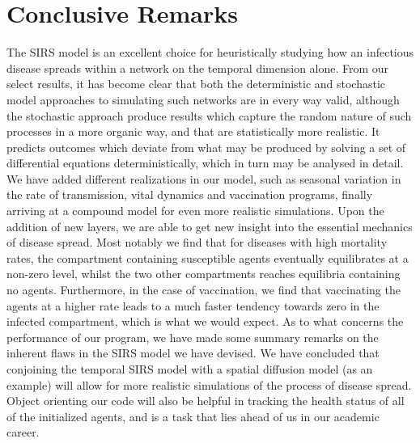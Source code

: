 \section{Conclusive Remarks}
The SIRS model is an excellent choice for heuristically studying how an infectious disease spreads within a network on the temporal dimension alone. From our select results, it has become clear that both the deterministic and stochastic model approaches to simulating such networks are in every way valid, although the stochastic approach produce results which capture the random nature of such processes in a more organic way, and that are statistically more realistic. It predicts outcomes which deviate 
from what may be produced by solving a set of differential equations deterministically, which in turn may be analysed in detail. We have added different realizations in our model, such as seasonal variation in the rate of transmission, vital dynamics and vaccination programs, finally arriving at a compound model for even more realistic simulations. Upon the addition of new layers, we are able to get new insight into the essential mechanics of disease spread. Most notably we find that for diseases with high mortality rates, the compartment containing susceptible agents eventually equilibrates at a non-zero level, whilst the two other compartments reaches equilibria containing no agents. Furthermore, in the case of vaccination, we find that vaccinating the agents at a higher rate leads to a much faster tendency towards zero in the infected compartment, which is what we would expect. As to what concerns the performance of our program, we have made some summary remarks on the inherent flaws in the SIRS model we have devised. We have concluded that conjoining the temporal SIRS model with a spatial diffusion model (as an example) will allow for more realistic simulations of the process of disease spread. Object orienting our code will also be helpful in tracking the health status of all of the initialized agents, and is a task that lies ahead of us in our academic career. 